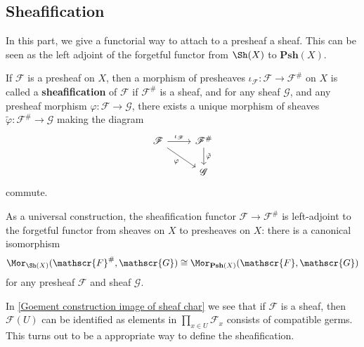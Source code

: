 \subsection{Sheafification}
In this part, we give a functorial way to attach to a presheaf a sheaf. This can be seen as the left adjoint of the forgetful functor from $\Sh(X)$ to $\mathbf{Psh}(X)$.
\begin{definition}
If $\mathscr{F}$ is a presheaf on $X$, then a morphism of presheaves $\iota_{\mathscr{F}}:\mathscr{F}\to\mathscr{F}^{\#}$ on $X$ is called a \textbf{sheafification} of $\mathscr{F}$ if $\mathscr{F}^{\#}$ is a sheaf, and for any sheaf $\mathscr{G}$, and any presheaf morphism $\varphi:\mathscr{F}\to\mathscr{G}$, there exists a unique morphism of sheaves $\tilde{\varphi}:\mathscr{F}^{\#}\to\mathscr{G}$ making the diagram
\[\begin{tikzcd}
\mathscr{F}\ar[rd,swap,"\varphi"]\ar[r,"\iota_{\mathscr{F}}"]&\mathscr{F}^{\#}\ar[d,"\tilde{\varphi}"]\\
&\mathscr{G}
\end{tikzcd}\]
commute.\par
As a universal construction, the sheafification functor $\mathscr{F}\to\mathscr{F}^{\#}$ is left-adjoint to the forgetful functor from sheaves on $X$ to presheaves on $X$: there is a canonical isomorphism
\[\Mor_{\Sh(X)}(\mathscr{F}^{\#},\mathscr{G})\cong\Mor_{\mathbf{Psh}(X)}(\mathscr{F},\mathscr{G})\]
for any presheaf $\mathscr{F}$ and sheaf $\mathscr{G}$.
\end{definition}
In \cref{Goement construction image of sheaf char} we see that if $\mathscr{F}$ is a sheaf, then $\mathscr{F}(U)$ can be identified as elements in $\prod_{x\in U}\mathscr{F}_x$ consists of compatible germs. This turns out to be a appropriate way to define the sheafification.
